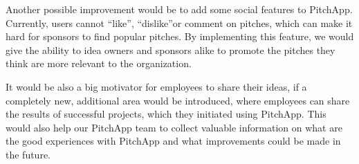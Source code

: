 Another possible improvement would be to add some social features to PitchApp. Currently, users cannot “like”, “dislike”or comment on pitches, which can make it hard for sponsors to find popular pitches. By implementing this feature, we would give the ability to idea owners and sponsors alike to promote the pitches they think are more relevant to the organization.

It would be also a big motivator for employees to share their ideas, if a completely new, additional area would be introduced, where employees can share the results of successful projects, which they initiated using PitchApp. This would also help our PitchApp team to collect valuable information on what are the good experiences with PitchApp and what improvements could be made in the future.
